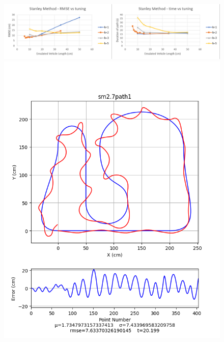 \documentclass[12pt]{article}
\begin{document}
\begin{flushleft}
\begin{figure}[H]
\includegraphics[width=\linewidth]{images/tuningGraphs/sm}
\includegraphics[width=\linewidth]{images/pathData/smpath1}
\endminipage\hfill
{}

\end{figure}
\end{flushleft}
\end{document}
